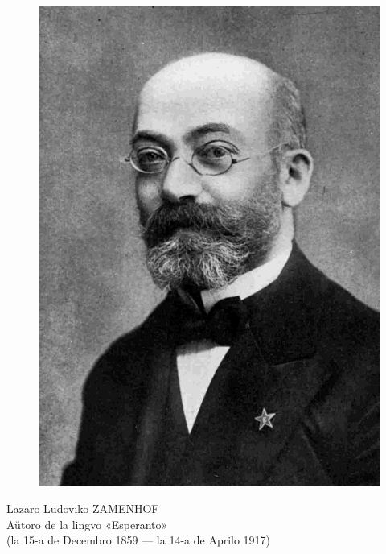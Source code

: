 \documentclass[a5paper,11pt,openany,twoside]{book}
\begin{document}
\newpage

%
%
\thispagestyle{empty}
\begin{center}
\begin{figure}[!ht]
\centering
\includegraphics[scale=0.15]{Zamenhof}
\end{figure}
\vspace*{0.5cm}
\nicefont
{\LARGE Lazaro Ludoviko ZAMENHOF} \\[1ex]
{\large Aŭtoro de la lingvo «Esperanto»} \\[1ex]
{\small (la 15-a de Decembro 1859 --- la 14-a de Aprilo 1917)}
\end{center}
\newpage

%
%

\end{document}
